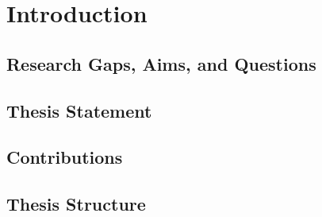 \chapter{Introduction} \label{chap:introduction} 

\section{Research Gaps, Aims, and Questions}

\section{Thesis Statement} 

\section{Contributions} 

\section{Thesis Structure}
